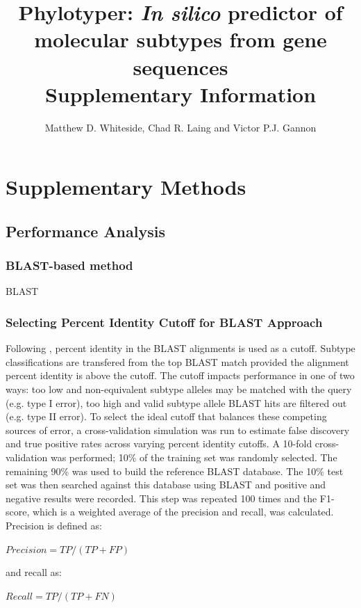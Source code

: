 \documentclass[11pt,letterpaper]{article}
\title{Phylotyper: {\it In silico} predictor of molecular subtypes from gene sequences \\ \large Supplementary Information}
\author{Matthew D. Whiteside, Chad R. Laing and Victor P.J. Gannon}
\date{ }
\begin{document}
 
 
\tableofcontents

\clearpage

\section{Supplementary Methods}

\subsection{Performance Analysis}

\subsubsection{BLAST-based method}

BLAST 

\subsubsection{Selecting Percent Identity Cutoff for BLAST Approach}

Following \citep{Jenkins2015}, percent identity in the BLAST alignments is used as a cutoff. Subtype classifications are transfered from the top BLAST match provided the alignment percent identity is above the cutoff. The cutoff impacts performance in one of two ways: too low and non-equivalent subtype alleles may be matched with the query (e.g. type I error), too high and valid subtype allele BLAST hits are filtered out (e.g. type II error). To select the ideal cutoff that balances these competing sources of error, a cross-validation simulation was run to estimate false discovery and true positive rates across varying percent identity cutoffs. A 10-fold cross-validation was performed; 10\% of the training set was randomly selected. The remaining 90\% was used to build the reference BLAST database. The 10\% test set was then searched against this database using BLAST and positive and negative results were recorded. This step was repeated 100 times and the F1-score, which is a weighted average of the precision and recall, was calculated. Precision is defined as: 

$Precision = TP / (TP + FP)$

and recall as:

$Recall = TP / (TP + FN)$
\end{document}
